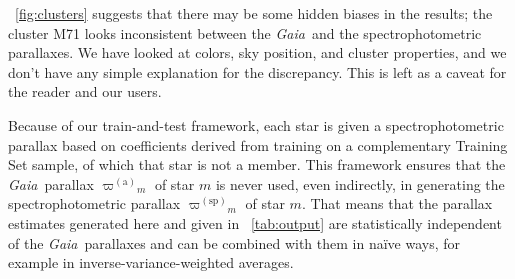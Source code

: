 \documentclass[modern]{aastex62}
\newcommand{\project}[1]{\textsl{#1}}
\newcommand{\gaia}{\project{Gaia}}
\newcommand{\gparallax}{{\varpi^{(\mathrm{a})}}}
\newcommand{\sparallax}{{\varpi^{(\mathrm{sp})}}}
\begin{document}
\figurename~\ref{fig:clusters} suggests that there may be some hidden biases in
the results; the cluster M71 looks inconsistent between the \gaia\ and the spectrophotometric
parallaxes.
We have looked at colors, sky position, and cluster properties, and we don't have any
simple explanation for the discrepancy.
This is left as a caveat for the reader and our users.

Because of our train-and-test framework, each star is given a spectrophotometric
parallax based on coefficients derived from training on a complementary Training Set sample, of
which that star is not a member.
This framework ensures that the \gaia\ parallax $\gparallax_m$ of star $m$ is never used,
even indirectly, in generating the spectrophotometric parallax $\sparallax_m$ of star $m$.
That means that the parallax estimates generated here and given in \tablename~\ref{tab:output}
are statistically independent of the \gaia\ parallaxes and can be combined with them in
na\"ive ways, for example in inverse-variance-weighted averages.
\end{document}
